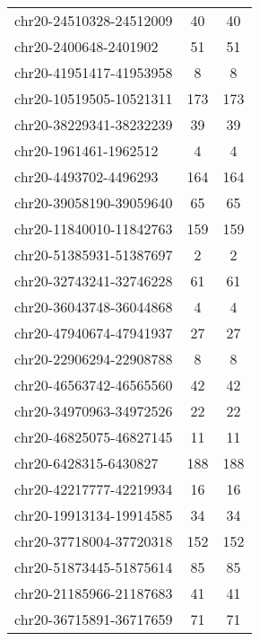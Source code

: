\begin{longtable}{lSS}
	chr20-24510328-24512009 & 40   & 40                              \\
	chr20-2400648-2401902   & 51   & 51                              \\
	chr20-41951417-41953958 & 8    & 8                               \\
	chr20-10519505-10521311 & 173  & 173                             \\
	chr20-38229341-38232239 & 39   & 39                              \\
	chr20-1961461-1962512   & 4    & 4                               \\
	chr20-4493702-4496293   & 164  & 164                             \\
	chr20-39058190-39059640 & 65   & 65                              \\
	chr20-11840010-11842763 & 159  & 159                             \\
	chr20-51385931-51387697 & 2    & 2                               \\
	chr20-32743241-32746228 & 61   & 61                              \\
	chr20-36043748-36044868 & 4    & 4                               \\
	chr20-47940674-47941937 & 27   & 27                              \\
	chr20-22906294-22908788 & 8    & 8                               \\
	chr20-46563742-46565560 & 42   & 42                              \\
	chr20-34970963-34972526 & 22   & 22                              \\
	chr20-46825075-46827145 & 11   & 11                              \\
	chr20-6428315-6430827   & 188  & 188                             \\
	chr20-42217777-42219934 & 16   & 16                              \\
	chr20-19913134-19914585 & 34   & 34                              \\
	chr20-37718004-37720318 & 152  & 152                             \\
	chr20-51873445-51875614 & 85   & 85                              \\
	chr20-21185966-21187683 & 41   & 41                              \\
	chr20-36715891-36717659 & 71   & 71                              \\

\end{longtable}

